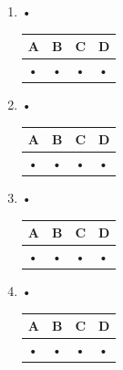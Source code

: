 \documentclass[oneside,12pt]{exam}          %
\begin{document}
\begin{enumerate}[label=\underline{Question \no\arabic*} :  , leftmargin=* , itemsep=1mm]
	\item •
	
		\hspace{\linewidth-\textwidth}
		\renewcommand{\arraystretch}{1.5}
		\begin{tabular}{| P{0.22\textwidth} | P{0.22\textwidth} | P{0.22\textwidth} | P{0.22\textwidth} |} \hline
			A & B & C & D \\ \hline
			• & • & • & • \\ \hline
		\end{tabular}



	\item •
	
		\hspace{\linewidth-\textwidth}
		\renewcommand{\arraystretch}{1.5}
		\begin{tabular}{| P{0.22\textwidth} | P{0.22\textwidth} | P{0.22\textwidth} | P{0.22\textwidth} |} \hline
			A & B & C & D \\ \hline
			• & • & • & • \\ \hline
		\end{tabular}
		
		

	\item •
	
		\hspace{\linewidth-\textwidth}
		\renewcommand{\arraystretch}{1.5}
		\begin{tabular}{| P{0.22\textwidth} | P{0.22\textwidth} | P{0.22\textwidth} | P{0.22\textwidth} |} \hline
			A & B & C & D \\ \hline
			• & • & • & • \\ \hline
		\end{tabular}
		
		

	\item •
	
		\hspace{\linewidth-\textwidth}
		\renewcommand{\arraystretch}{1.5}
		\begin{tabular}{| P{0.22\textwidth} | P{0.22\textwidth} | P{0.22\textwidth} | P{0.22\textwidth} |} \hline
			A & B & C & D \\ \hline
			• & • & • & • \\ \hline
		\end{tabular}
		

\end{enumerate}
\end{document}
